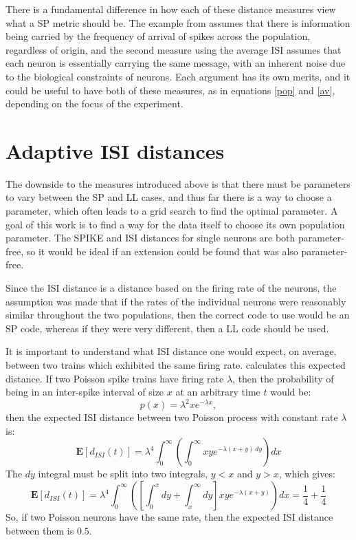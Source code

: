 There is a fundamental difference in how each of these distance measures view what a SP metric should be.  The example from \citep{KreuzEtAl2009a} assumes that there is information being carried by the frequency of arrival of spikes across the population, regardless of origin, and the second measure using the average ISI assumes that each neuron is essentially carrying the same message, with an inherent noise due to the biological constraints of neurons.  Each argument has its own merits, and it could be useful to have both of these measures, as in equations \ref{pop} and \ref{av}, depending on the focus of the experiment.


\newpage
\section{Adaptive ISI distances}

The downside to the measures introduced above is that there must be parameters to vary between the SP and LL cases, and thus far there is a way to choose a parameter, which often leads to a grid search to find the optimal parameter.  A goal of this work is to find a way for the data itself to choose its own population parameter.  The SPIKE and ISI distances for single neurons are both parameter-free, so it would be ideal if an extension could be found that was also parameter-free.

Since the ISI distance is a distance based on the firing rate of the neurons, the assumption was made that if the rates of the individual neurons were reasonably similar throughout the two populations, then the correct code to use would be an SP code, whereas if they were very different, then a LL code should be used.

It is important to understand what ISI distance one would expect, on average, between two trains which exhibited the same firing rate.  \citep{MulanskyEtAl2015a} calculates this expected distance. If two Poisson spike trains have firing rate $\lambda$, then the probability of being in an inter-spike interval of size $x$ at an arbitrary time $t$ would be:
\begin{equation}
p(x) = \lambda^2 x e^{-\lambda x},
\end{equation}
then the expected ISI distance between two Poisson process with constant rate $\lambda$ is:
\begin{equation}
\mathbf{E}[d_{ISI}(t)] = \lambda^4 \int_0^{\infty} \left( \int_0^{\infty} xye^{-\lambda(x+y)\,dy}\right) dx
\end{equation}
The $dy$ integral must be split into two integrals, $y<x$ and $y>x$, which gives:
\begin{equation}
\mathbf{E}[d_{ISI}(t)]  = \lambda^4 \int_0^{\infty}\left(  \left[\int_0^xdy +\int_x^{\infty}dy\right] xye^{-\lambda(x+y)} \right)dx = \frac{1}{4} + \frac{1}{4}
\end{equation}
So, if two Poisson neurons have the same rate, then the expected ISI distance between them is $0.5$.

